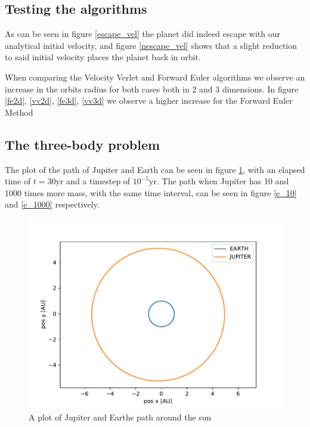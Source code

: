 \documentclass[a4paper]{article}
\begin{document}
\subsection{Testing the algorithms}
As can be seen in figure \ref{escape_vel} the planet did indeed escape with our analytical initial velocity, and figure \ref{nescape_vel} shows that a slight reduction to said initial velocity places the planet back in orbit.

When comparing the Velocity Verlet and Forward Euler algorithms we observe an increase in the orbits radius for both cases both in 2 and 3 dimensions. In figure \ref{fe2d}, \ref{vv2d}, \ref{fe3d}, \ref{vv3d} we observe a higher increase for the Forward Euler Method

\subsection{The three-body problem}
The plot of the path of Jupiter and Earth can be seen in figure \ref{e_1}, with an elapsed time of $t=30\text{yr}$ and a timestep of $10^{-5} \text{yr}$. The path when Jupiter has 10 and 1000 times more mass, with the same time interval, can be seen in figure \ref{e_10} and \ref{e_1000} respectively. 

\begin{figure}[h!]
		\centering 
		\includegraphics[scale=0.7]{../opp_e1.pdf}
		\caption{A plot of Jupiter and Earths path around the sun}
		\label{e_1}
\end{figure}
\end{document}
